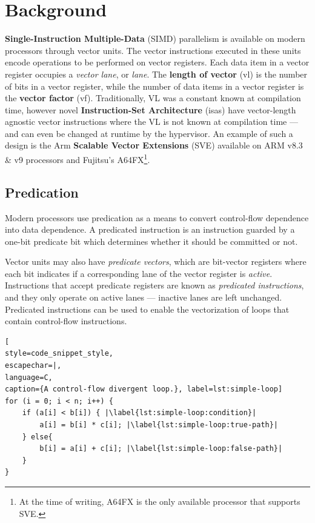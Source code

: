 \newpage
\chapter{Background}
\label{chap:background}

\textbf{Single-Instruction Multiple-Data} (SIMD) parallelism is available on modern processors through vector units.
The vector instructions executed in these units encode operations to be performed on vector registers.
Each data item in a vector register occupies a \emph{vector lane}, or \emph{lane}.
The \textbf{length  of vector} (\acrshort{vl}) is the number of bits in a vector register, while the number of data items in a vector register is the \textbf{vector factor} (\acrshort{vf}).
Traditionally, VL was a constant known at compilation time, however novel \textbf{Instruction-Set Architecture} (\acrshort{isa}s) have vector-length agnostic vector instructions where the VL is not known at compilation time --- and can even be changed at runtime by the hypervisor.
An example of such a design is the Arm \textbf{Scalable Vector Extensions} (SVE) available on ARM v8.3 \& v9 processors and Fujitsu's A64FX\footnote{At the time of writing, A64FX is the only available processor that supports SVE.}.

\section{Predication}
Modern processors use predication as a means to convert control-flow dependence into data dependence. A predicated instruction is an instruction guarded by a one-bit predicate bit which determines whether it should be committed or not. 

Vector units may also have \emph{predicate vectors}, 
 which are bit-vector registers where each bit indicates if a corresponding lane of the vector register is \emph{active}.
Instructions that accept predicate registers are known as \emph{predicated instructions}, and they only operate on active lanes --- inactive lanes are left unchanged.
Predicated instructions can be used to enable the vectorization of loops that contain control-flow instructions.

\begin{center}
\begin{minipage}[t]{0.8\columnwidth}
\begin{lstlisting}[
style=code_snippet_style,
escapechar=|,
language=C,
caption={A control-flow divergent loop.}, label=lst:simple-loop]
for (i = 0; i < n; i++) {
    if (a[i] < b[i]) { |\label{lst:simple-loop:condition}|
        a[i] = b[i] * c[i]; |\label{lst:simple-loop:true-path}|
    } else{
        b[i] = a[i] + c[i]; |\label{lst:simple-loop:false-path}|
    }
}
\end{lstlisting}
\end{minipage}
\end{center}


